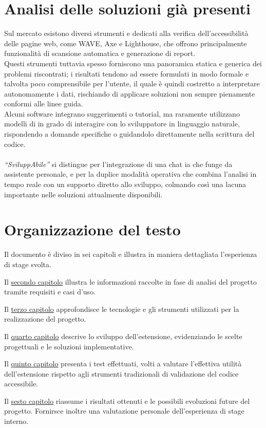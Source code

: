 \section{Analisi delle soluzioni già presenti}
\noindent Sul mercato esistono diversi strumenti e  dedicati alla verifica dell’accessibilità delle pagine web, come WAVE, Axe e Lighthouse, che offrono principalmente funzionalità di scansione automatica e generazione di report.\\ 
Questi strumenti tuttavia spesso forniscono una panoramica statica e generica dei problemi riscontrati; i risultati tendono ad essere formulati in modo formale e talvolta poco comprensibile per l’utente, il quale è quindi costretto a interpretare autonomamente i dati, rischiando di applicare soluzioni non sempre pienamente conformi alle linee guida.\\ 
Alcuni software integrano suggerimenti o tutorial, ma raramente utilizzano modelli di  in grado di interagire con lo sviluppatore in linguaggio naturale, rispondendo a domande specifiche o guidandolo direttamente nella scrittura del codice. \\
\\
\textit{“SviluppAbile”} si distingue per l’integrazione di una chat \acrshort{ia} che funge da assistente personale, e per la duplice modalità operativa che combina l’analisi in tempo reale con un supporto diretto allo sviluppo, colmando così una lacuna importante nelle soluzioni attualmente disponibili.

\section{Organizzazione del testo}
\noindent Il documento è diviso in sei capitoli e illustra in maniera dettagliata l’esperienza di stage svolta.

\begin{description}
    \item Il {\hyperref[chap:analisi-requisiti]{secondo capitolo}} illustra le informazioni raccolte in fase di analisi del progetto tramite requisiti e casi d’uso.
    \item Il {\hyperref[chap:linguaggi-tecnologie]{terzo capitolo}} approfondisce le tecnologie e gli strumenti utilizzati per la realizzazione del progetto.
    \item Il {\hyperref[chap:sviluppo]{quarto capitolo}} descrive lo sviluppo dell’estensione, evidenziando le scelte progettuali e le soluzioni implementative.
    \item Il {\hyperref[chap:test]{ quinto capitolo}} presenta i test effettuati, volti a valutare l’effettiva utilità dell’estensione rispetto agli strumenti tradizionali di validazione del codice accessibile.
    \item Il {\hyperref[chap:conclusioni]{ sesto capitolo}} riassume i risultati ottenuti e le possibili evoluzioni future del progetto. Fornirsce inoltre una valutazione personale dell’esperienza di stage interno.
\end{description}

